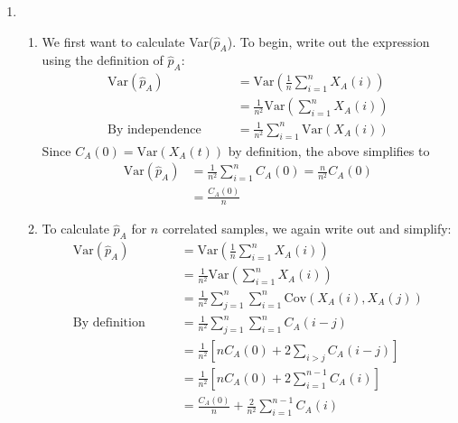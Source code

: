 \documentclass[12pt]{article}
\theoremstyle{plain}
\theoremstyle{definition}
\theoremstyle{remark}
\begin{document}
\begin{enumerate}
  \item %
    \begin{enumerate}
      \item %
        We first want to calculate Var($\hat{p}_A$). To begin, write out
        the expression using the definition of $\hat{p}_A$:
        \begin{align*}
          \text{Var}(\hat{p}_A)
          &=\text{Var}\left( \frac{1}{n} \sum^n_{i=1} X_A(i)\right) \\
          &= \frac{1}{n^2} \text{Var}\left( \sum^n_{i=1} X_A(i)\right) \\
          \text{By independence} \qquad
          &= \frac{1}{n^2} \sum^n_{i=1}  \text{Var}\left(X_A(i)\right)
        \end{align*}
        Since $C_A(0) = \text{Var}(X_A(t))$ by definition, the above
        simplifies to
        \begin{align*}
          \text{Var}(\hat{p}_A)
          &= \frac{1}{n^2} \sum^n_{i=1}  C_A(0)
          = \frac{n}{n^2} C_A(0)\\
          &= \frac{C_A(0)}{n}
        \end{align*}

      \item %
        To calculate $\hat{p}_A$ for $n$ correlated samples, we again
        write out and simplify:
        \begin{align*}
          \text{Var}(\hat{p}_A)
          &=\text{Var}\left( \frac{1}{n} \sum^n_{i=1} X_A(i)\right) \\
          &= \frac{1}{n^2} \text{Var}\left( \sum^n_{i=1} X_A(i)\right) \\
          &= \frac{1}{n^2} \sum^n_{j=1}\sum^n_{i=1}
            \text{Cov}\left(X_A(i), X_A(j)\right)\\
          \text{By definition} \qquad
            &= \frac{1}{n^2} \sum^n_{j=1}\sum^n_{i=1} C_A(i-j) \\
          &= \frac{1}{n^2}
            \left[ n C_A(0) + 2 \sum_{i>j} C_A(i-j) \right] \\
          &= \frac{1}{n^2}
            \left[ n C_A(0) + 2 \sum^{n-1}_{i=1} C_A(i) \right] \\
          &= \frac{C_A(0)}{n}
            + \frac{2}{n^2} \sum^{n-1}_{i=1} C_A(i)
        \end{align*}


    \end{enumerate}

\end{enumerate}



\end{document}
